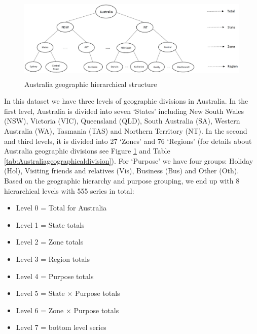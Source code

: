\documentclass[11pt,a4paper,]{article}
\providecommand{\tightlist}{%
  \setlength{\itemsep}{0pt}\setlength{\parskip}{0pt}}
\begin{document}
\begin{figure}

{\centering \includegraphics[width=450px,height=150px]{Paper-Figures/Australian_hierarchy_structure} 

}

\caption{Australia geographic hierarchical structure}\label{fig:Australiahierarchystructure}
\end{figure}

In this dataset we have three levels of geographic divisions in Australia. In the first level, Australia is divided into seven `States' including New South Wales (NSW), Victoria (VIC), Queensland (QLD), South Australia (SA), Western Australia (WA), Tasmania (TAS) and Northern Territory (NT). In the second and third levels, it is divided into 27 `Zones' and 76 `Regions' (for details about Australia geographic divisions see Figure \ref{fig:Australiahierarchystructure} and Table \ref{tab:Australiageographicaldivision}). For `Purpose' we have four groups: Holiday (Hol), Visiting friends and relatives (Vis), Business (Bus) and Other (Oth). Based on the geographic hierarchy and purpose grouping, we end up with 8 hierarchical levels with 555 series in total:

\begin{itemize}
\tightlist
\item
  Level 0 = Total for Australia
\item
  Level 1 = State totals
\item
  Level 2 = Zone totals
\item
  Level 3 = Region totals
\item
  Level 4 = Purpose totals
\item
  Level 5 = State \(\times\) Purpose totals
\item
  Level 6 = Zone \(\times\) Purpose totals
\item
  Level 7 = bottom level series
\end{itemize}
\end{document}
